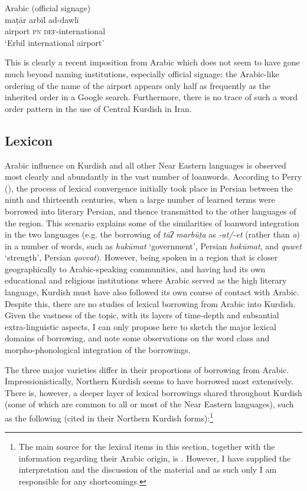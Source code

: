 \documentclass[output=paper]{langsci/langscibook}
\begin{document}
\ea\label{bkm:Ref14772143}Arabic (official signage)\\
\gll maṭār arbīl ad-dawlī\\
     airport \textsc{pn} \textsc{def}{}-international\\
\glt ‘Erbil international airport’
\z

This is clearly a recent imposition from Arabic which does not seem to have gone much beyond naming institutions, especially official signage: the Arabic-like ordering of the name of the airport appears only half as frequently as the inherited order in a Google search. Furthermore, there is no trace of such a word order pattern in the use of Central Kurdish in Iran.  

\subsection{Lexicon}

Arabic influence on Kurdish and all other Near Eastern languages is observed most clearly and abundantly in the vast number of loanwords. According to Perry (\citeyear[97]{Perry2005}), the process of lexical convergence initially took place in Persian between the ninth and thirteenth centuries, when a large number of learned terms were borrowed into literary Persian, and thence transmitted to the other languages of the region. This scenario explains some of the similarities of loanword integration in the two languages (e.g. the borrowing of \textit{tāʔ} \textit{marbūṭa} as \textit{{}-at/-et} (rather than \textit{a}) in a number of words, such as \textit{hukūmat} ‘government’, Persian \textit{hokūmat}, and \textit{quwet} ‘strength’, Persian \textit{qovvat}). However, being spoken in a region that is closer geographically to Arabic-speaking communities, and having had its own educational and religious institutions where Arabic served as the high literary language, Kurdish must have also followed its own course of contact with Arabic. Despite this, there are no studies of lexical borrowing from Arabic into Kurdish. Given the vastness of the topic, with its layers of time-depth and subsantial extra-linguistic aspects, I can only propose here to sketch the major lexical domains of borrowing, and note some observations on the word class and morpho-phonological integration of the borrowings. 

The three major varieties differ in their proportions of borrowing from Arabic. Impressionistically, Northern Kurdish seems to have borrowed most extensively. There is, however, a deeper layer of lexical borrowings shared throughout Kurdish (some of which are common to all or most of the Near Eastern languages), such as the following (cited in their Northern Kurdish forms):\footnote{The main source for the lexical items in this section, together with the information regarding their Arabic origin, is \citet{Chyet2003}. However, I have supplied the interpretation and the discussion of the material and as such only I am responsible for any shortcomings.} 
\end{document}
